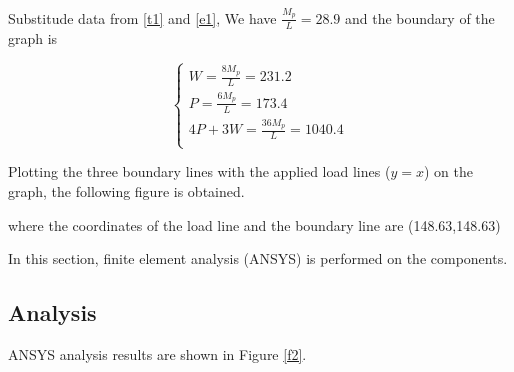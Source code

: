 Substitude data from \autoref{t1} and \autoref{e1}, We have $\frac{M_p}{L}=28.9$ and the boundary of the graph is 

$$
\left\{ \begin{array}{l}
	W=\frac{8M_p}{L}=231.2\\
	P=\frac{6M_p}{L}=173.4\\
	4P+3W=\frac{36M_p}{L}=1040.4\\
\end{array} \right. 
$$

Plotting the three boundary lines with the applied load lines ($y=x$) on the graph, the following figure is obtained.

where the coordinates of the load line and the boundary line are (148.63,148.63)










\iffalse

In this section, finite element analysis (ANSYS) is performed on the components.

\subsection*{Analysis}

ANSYS analysis results are shown in Figure \ref{f2}.

